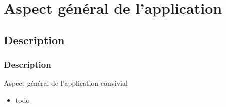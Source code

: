 \documentclass{beamer}
\begin{document}
\section{Aspect général de l'application}
  \subsection{Description}
  \begin{frame}
   \frametitle{Description}
  Aspect général de l'application convivial
   \begin{itemize}
   \item todo
   \end{itemize}
  \end{frame}


\end{document}
